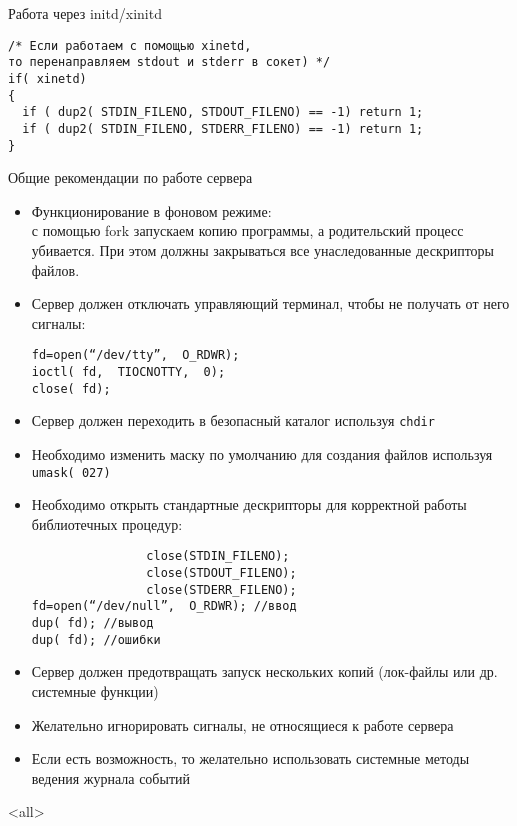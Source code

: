 \begin{frame}[fragile]{Работа через initd/xinitd}
	\scriptsize	
\begin{lstlisting}[Language=C]
/* Если работаем с помощью xinetd, 
то перенаправляем stdout и stderr в сокет) */
if( xinetd) 
{ 
  if ( dup2( STDIN_FILENO, STDOUT_FILENO) == -1) return 1;
  if ( dup2( STDIN_FILENO, STDERR_FILENO) == -1) return 1;
} 
\end{lstlisting}
	\normalsize
\end{frame}

\begin{frame}[fragile]{Общие рекомендации по работе сервера}
	\scriptsize
	\begin{itemize}
		\item Функционирование в фоновом режиме:\\
			с помощью fork запускаем копию программы, а родительский процесс убивается. При этом должны закрываться все унаследованные дескрипторы файлов.
		\item Сервер должен отключать управляющий терминал,  чтобы не получать от него сигналы:\\
			\begin{verbatim}
fd=open(“/dev/tty”,  O_RDWR);
ioctl( fd,  TIOCNOTTY,  0);
close( fd);
			\end{verbatim}
		\item Сервер должен переходить в безопасный каталог используя {\tt chdir}
		\item Необходимо изменить маску по умолчанию для создания файлов используя {\tt umask( 027)}
		\item Необходимо открыть стандартные дескрипторы для корректной работы библиотечных процедур:\\
				\begin{verbatim}
				close(STDIN_FILENO);
				close(STDOUT_FILENO);
				close(STDERR_FILENO);
fd=open(“/dev/null”,  O_RDWR); //ввод
dup( fd); //вывод
dup( fd); //ошибки
			\end{verbatim}
		\item Сервер должен предотвращать запуск нескольких копий (лок-файлы или др. системные функции)
		\item Желательно игнорировать сигналы,  не относящиеся к работе сервера
		\item Если есть возможность,  то желательно использовать системные методы ведения журнала событий
	\end{itemize}
\end{frame}

\mode<all>{}


